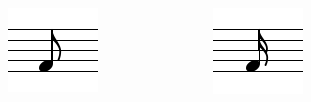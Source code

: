 \documentclass{beamer}
\begin{document}
\begin{frame}
\begin{columns}
\begin{column}{0.33\textwidth}
\begin{figure}[h!]
					\includegraphics[width=0.7\columnwidth]{res/pdf/4/note/eighth.pdf}
				\end{figure}
			\end{column}
			\begin{column}{0.33\textwidth}
				\centering
				\noindent
				\begin{figure}[h!]
					\includegraphics[width=0.7\columnwidth]{res/pdf/4/note/sixteenth.pdf}
				\end{figure}
			\end{column}
			\begin{column}{0.33\textwidth}
				\centering
				\noindent
				\begin{figure}[h!]

\end{figure}
\end{column}
\end{columns}
\end{frame}
\end{document}
